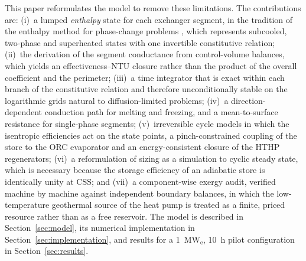 This paper reformulates the model to remove these limitations. The
contributions are: (i)~a lumped \emph{enthalpy} state for each exchanger
segment, in the tradition of the enthalpy method for phase-change problems
\cite{Voller1987,Alexiades1993}, which represents subcooled, two-phase and
superheated states with one invertible constitutive relation; (ii)~the
derivation of the segment conductance from control-volume balances, which
yields an effectiveness--NTU closure rather than the product of the overall
coefficient and the perimeter; (iii)~a time integrator that is exact within
each branch of the constitutive relation and therefore unconditionally stable
on the logarithmic grids natural to diffusion-limited problems; (iv)~a
direction-dependent conduction path for melting and freezing, and a
mean-to-surface resistance for single-phase segments; (v)~irreversible cycle models in
which the isentropic efficiencies act on the state points, a pinch-constrained
coupling of the store to the ORC evaporator and an energy-consistent closure
of the HTHP regenerators; (vi)~a reformulation of sizing as a simulation
to cyclic steady state, which is necessary because the storage efficiency of
an adiabatic store is identically unity at CSS; and (vii)~a component-wise
exergy audit, verified machine by machine against independent boundary
balances, in which the low-temperature geothermal source of the heat pump is
treated as a finite, priced resource rather than as a free reservoir. The model is described in
Section~\ref{sec:model}, its numerical implementation in
Section~\ref{sec:implementation}, and results for a
\SI{1}{\mega\watt}$_\mathrm{e}$, \SI{10}{\hour} pilot configuration in
Section~\ref{sec:results}.
